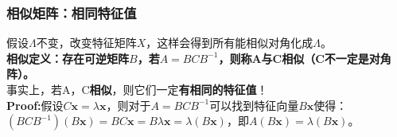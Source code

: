\documentclass[UTF8]{article}
\begin{document}
    \subsubsection{相似矩阵：相同特征值}
    假设$\Lambda$不变，改变特征矩阵$X$，这样会得到所有能相似对角化成$\Lambda$。\\
    \textbf{相似定义：存在可逆矩阵$B$，若$A=B C B^{-1}$，则称A与C相似（C不一定是对角阵）。}\\
    事实上，若A，C\textbf{相似}，则它们一定\textbf{有相同的特征值}！\\
    \textbf{Proof:}假设$C \boldsymbol{x}=\lambda \boldsymbol{x}$，则对于$A=B C B^{-1}$可以找到特征向量$B \boldsymbol{x}$使得：$\left(B C B^{-1}\right)(B \boldsymbol{x})=B C \boldsymbol{x}=B \lambda \boldsymbol{x}=\lambda(B \boldsymbol{x})$，即$A(B\bm{x})=\lambda (B\bm{x})$。
\end{document}
